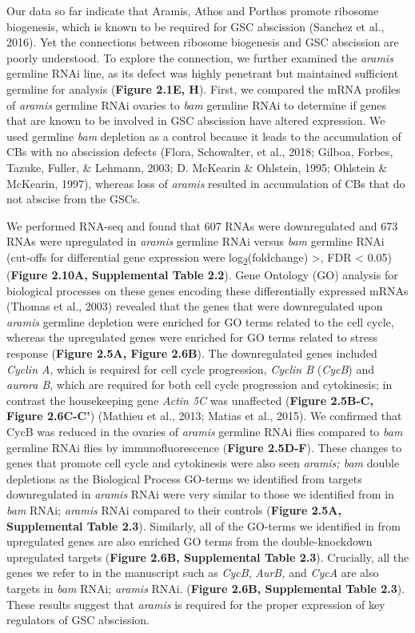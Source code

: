\documentclass[12pt,oneside]{reedthesis}
\begin{document}
Our data so far indicate that Aramis, Athos and Porthos promote ribosome biogenesis, which is known to be required for GSC abscission (Sanchez et al., 2016). Yet the connections between ribosome biogenesis and GSC abscission are poorly understood. To explore the connection, we further examined the \emph{aramis} germline RNAi line, as its defect was highly penetrant but maintained sufficient germline for analysis (\textbf{Figure 2.1E, H}). First, we compared the mRNA profiles of \emph{aramis} germline RNAi ovaries to \emph{bam} germline RNAi to determine if genes that are known to be involved in GSC abscission have altered expression. We used germline \emph{bam} depletion as a control because it leads to the accumulation of CBs with no abscission defects (Flora, Schowalter, et al., 2018; Gilboa, Forbes, Tazuke, Fuller, \& Lehmann, 2003; D. McKearin \& Ohlstein, 1995; Ohlstein \& McKearin, 1997), whereas loss of \emph{aramis} resulted in accumulation of CBs that do not abscise from the GSCs.

We performed RNA-seq and found that 607 RNAs were downregulated and 673 RNAs were upregulated in \emph{aramis} germline RNAi versus \emph{bam} germline RNAi (cut-offs for differential gene expression were log\textsubscript{2}(foldchange) \textgreater{}\textbar, FDR \textless{} 0.05) (\textbf{Figure 2.10A, Supplemental Table 2.2}). Gene Ontology (GO) analysis for biological processes on these genes encoding these differentially expressed mRNAs (Thomas et al., 2003) revealed that the genes that were downregulated upon \emph{aramis} germline depletion were enriched for GO terms related to the cell cycle, whereas the upregulated genes were enriched for GO terms related to stress response (\textbf{Figure 2.5A, Figure 2.6B}). The downregulated genes included \emph{Cyclin A}, which is required for cell cycle progression, \emph{Cyclin B} (\emph{CycB}) and \emph{aurora B}, which are required for both cell cycle progression and cytokinesis; in contrast the housekeeping gene \emph{Actin 5C} was unaffected (\textbf{Figure 2.5B-C, Figure 2.6C-C'}) (Mathieu et al., 2013; Matias et al., 2015). We confirmed that CycB was reduced in the ovaries of \emph{aramis} germline RNAi flies compared to \emph{bam} germline RNAi flies by immunofluorescence (\textbf{Figure 2.5D-F}). These changes to genes that promote cell cycle and cytokinesis were also seen \emph{aramis; bam} double depletions as the Biological Process GO-terms we identified from targets downregulated in \emph{aramis} RNAi were very similar to those we identified from in \emph{bam} RNAi; \emph{aramis} RNAi compared to their controls (\textbf{Figure 2.5A, Supplemental Table 2.3}). Similarly, all of the GO-terms we identified in from upregulated genes are also enriched GO terms from the double-knockdown upregulated targets (\textbf{Figure 2.6B, Supplemental Table 2.3}). Crucially, all the genes we refer to in the manuscript such as \emph{CycB}, \emph{AurB,} and \emph{CycA} are also targets in \emph{bam} RNAi; \emph{aramis} RNAi. (\textbf{Figure 2.6B, Supplemental Table 2.3}). These results suggest that \emph{aramis} is required for the proper expression of key regulators of GSC abscission.
\end{document}
